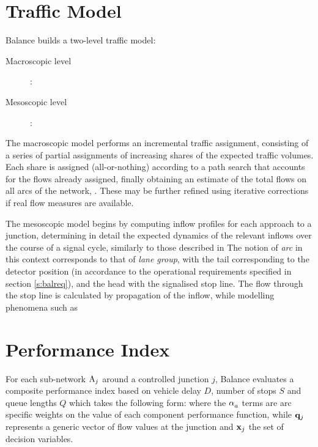 \section{Traffic Model}
Balance builds a two-level traffic model:
\begin{description}
\item[Macroscopic level]: 
\item[Mesoscopic level]: 
\end{description}

The macroscopic model performs an incremental traffic assignment, consisting of a series of partial assignments of increasing shares of the expected traffic volumes. Each share is assigned (all-or-nothing) according to a path search that accounts for the flows already assigned, finally obtaining an estimate of the total flows on all arcs of the network, . These may be further refined using iterative corrections if real flow measures are available.


The mesoscopic model begins by computing inflow profiles for each approach to a junction, determining in detail the expected dynamics of the relevant inflows over the course of a signal cycle, similarly to those described in  The notion of \emph{arc} in this context corresponds to that of \emph{lane group}, with the tail corresponding to the detector position (in accordance to the operational requirements specified in section \ref{s:balreq}), and the head with the signalised stop line.
The flow through the stop line is calculated by propagation of the inflow, while modelling phenomena such as 


\section{Performance Index}
For each sub-network $\mathrm{A}_j$ around a controlled junction $j$, Balance evaluates a composite performance index based on vehicle delay $D$, number of stops $S$ and queue lengths $Q$ which takes the following form:
\newcommand{\qjxj}{\mathsmaller{\mathsmaller{(\flows{j},\controlvars{j})}}}
\eq[,]{e:balancepi}{
\balpi{j}\qjxj = \sum_{a \in \bstar{j}}
\weight{a}{D} D_a\qjxj \: + \:
\weight{a}{S} S_a\qjxj \: + \:
\weight{a}{Q} Q_a\qjxj
}
where the $\alpha_{a}^{\scriptscriptstyle{}}$ terms are arc specific weights on the value of each component performance function, while $\mathbf{q}_{j}$ represents a generic vector of flow values at the junction and $\mathbf{x}_{j}$ the set of decision variables. 

